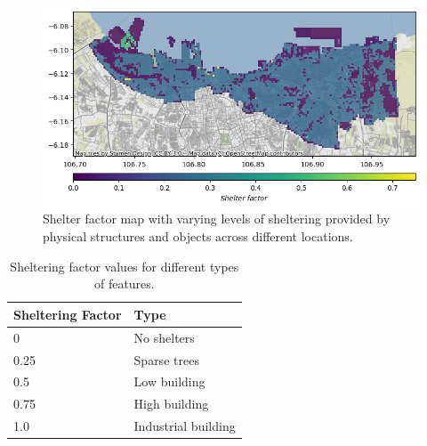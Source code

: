 \documentclass[12pt]{report}
\begin{document}
             \begin{figure}[H]
                 \centering
                 \includegraphics[width=\textwidth]{Plot/shelter_factor.png}
                 \caption{Shelter factor map with varying levels of sheltering provided by physical structures and objects across different locations.}
                 \label{fig:shelter_factor_map}
             \end{figure}
             
             \begin{table}[H]
                 \centering
                 \caption{Sheltering factor values for different types of features.}
                 \label{tab:sheltering_factor}
                 \begin{tabular}{|p{4cm}|p{4cm}|}
                     \hline
                     Sheltering Factor & Type \\
                     \hline
                     0 & No shelters \\
                     \hline
                     0.25 & Sparse trees \\
                     \hline
                     0.5 & Low building \\
                     \hline
                     0.75 & High building \\
                     \hline
                     1.0 & Industrial building \\
                     \hline
                 \end{tabular}
             \end{table}
\end{document}
